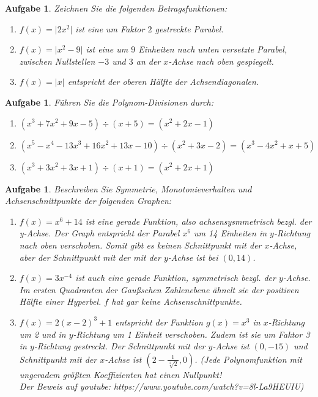 \documentclass[12pt]{article}
\newtheorem{exercise}[satz]{Aufgabe}
\begin{document}
\vspace{0.1cm}

\begin{exercise}
  Zeichnen Sie die folgenden Betragsfunktionen:
  \begin{enumerate}
    \item[(a)] $f(x) = \vert 2x^2 \vert$ ist eine um Faktor $2$ gestreckte Parabel. 
    \item[(b)] $f(x) = \vert x^2 - 9 \vert$ ist eine um $9$ Einheiten nach unten versetzte Parabel, zwischen Nullstellen $-3$ und $3$ an der $x$-Achse nach oben gespiegelt.
    \item[(c)]$f(x) = \vert x \vert$ entspricht der oberen H\"alfte der Achsendiagonalen.
  \end{enumerate}
\end{exercise} 

\vspace{0.1cm}

\begin{exercise}
  F\"uhren Sie die Polynom-Divisionen durch:
  \begin{enumerate}
  \item[(a)] $(x^3+7x^2+9x-5)\div(x+5) = (x^2+2x-1)$
  \item[(b)] $(x^5-x^4-13x^3+16x^2+13x-10)\div(x^2+3x-2) = (x^3-4x^2+x+5)$
  \item[(c)] $(x^3+3x^2+3x+1)\div(x+1) = (x^2+2x+1)$
  \end{enumerate}
\end{exercise}

\vspace{0.1cm}

\begin{exercise}
  Beschreiben Sie Symmetrie, Monotonieverhalten und Achsenschnittpunkte der folgenden Graphen:
  \begin{enumerate}
    \item[(a)] $f(x) = x^6 + 14$ ist eine gerade Funktion, also achsensysmmetrisch bezgl. der y-Achse. Der Graph entspricht der Parabel $x^6$ um 14 Einheiten in $y$-Richtung nach oben verschoben. Somit gibt es keinen Schnittpunkt mit der $x$-Achse, aber der Schnittpunkt mit der mit der $y$-Achse ist bei $(0,14)$.
    \item[(b)] $f(x) = 3x^{-4}$ ist auch eine gerade Funktion, symmetrisch bezgl. der $y$-Achse. Im ersten Quadranten der Gau\ss schen Zahlenebene \"ahnelt sie der positiven H\"alfte einer Hyperbel. $f$ hat gar keine Achsenschnittpunkte.
    \item[(c)] $f(x) = 2(x-2)^3 + 1$ entspricht der Funktion $g(x) = x^3$ in $x$-Richtung um 2 und in $y$-Richtung um 1 Einheit verschoben. Zudem ist sie um Faktor 3 in $y$-Richtung gestreckt. Der Schnittpunkt mit der $y$-Achse ist $(0,-15)$ und Schnittpunkt mit der $x$-Achse ist $(2-\frac{1}{\sqrt[3]{2}},0)$. (Jede Polynomfunktion mit ungeradem gr\"o\ss ten Koeffizienten hat einen Nullpunkt!\\
  Der Beweis auf youtube: https://www.youtube.com/watch?v=8l-La9HEUIU)
  \end{enumerate}
\end{exercise}
\end{document}
